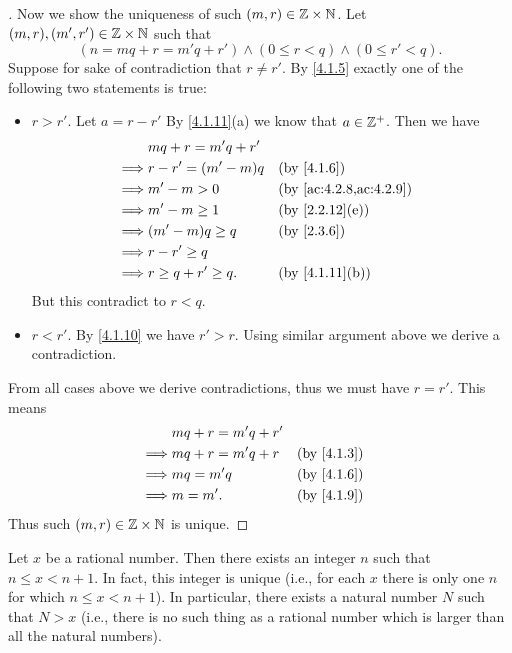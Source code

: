 \begin{proof}[]
  Now we show the uniqueness of such \((m, r) \in \mathbb{Z} \times \mathbb{N}\).
  Let \((m, r), (m', r') \in \mathbb{Z} \times \mathbb{N}\) such that
  \[
    (n = mq + r = m'q + r') \land (0 \leq r < q) \land (0 \leq r' < q).
  \]
  Suppose for sake of contradiction that \(r \neq r'\).
  By \cref{4.1.5} exactly one of the following two statements is true:
  \begin{itemize}
    \item \(r > r'\).
          Let \(a = r - r'\)
          By \cref{4.1.11}(a) we know that \(a \in \mathbb{Z}^+\).
          Then we have
          \begin{align*}
                     & mq + r = m'q + r'                                 \\
            \implies & r - r' = (m' - m)q    &  & \by{4.1.6}             \\
            \implies & m' - m > 0            &  & \by{ac:4.2.8,ac:4.2.9} \\
            \implies & m' - m \geq 1         &  & \by{2.2.12}[e]         \\
            \implies & (m' - m)q \geq q      &  & \by{2.3.6}             \\
            \implies & r - r' \geq q                                     \\
            \implies & r \geq q + r' \geq q. &  & \by{4.1.11}[b]
          \end{align*}
          But this contradict to \(r < q\).
    \item \(r < r'\).
          By \cref{4.1.10} we have \(r' > r\).
          Using similar argument above we derive a contradiction.
  \end{itemize}
  From all cases above we derive contradictions, thus we must have \(r = r'\).
  This means
  \begin{align*}
             & mq + r = m'q + r'                 \\
    \implies & mq + r = m'q + r  &  & \by{4.1.3} \\
    \implies & mq = m'q          &  & \by{4.1.6} \\
    \implies & m = m'.           &  & \by{4.1.9}
  \end{align*}
  Thus such \((m, r) \in \mathbb{Z} \times \mathbb{N}\) is unique.
\end{proof}

\begin{prop}\label{4.4.1}
  Let \(x\) be a rational number.
  Then there exists an integer \(n\) such that \(n \leq x < n + 1\).
  In fact, this integer is unique (i.e., for each \(x\) there is only one \(n\) for which \(n \leq x < n + 1\)).
  In particular, there exists a natural number \(N\) such that \(N > x\)
  (i.e., there is no such thing as a rational number which is larger than all the natural numbers).
\end{prop}

